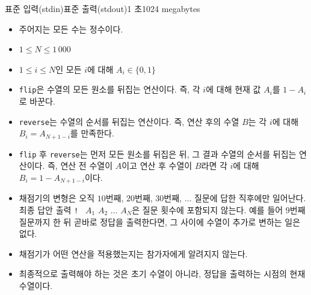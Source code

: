 \begin{problem}{\probtitle}{표준 입력(stdin)}{표준 출력(stdout)}{1 초}{1024 megabytes}
\newpage 

\Constraints

\begin{itemize}[topsep=0pt,noitemsep]
    \item 주어지는 모든 수는 정수이다.
    \item $1 \le N \le 1\,000$
    \item $1 \le i \le N$인 모든 $i$에 대해 $A_i \in \{0,1\}$
\end{itemize}

\Example

\begin{example}
\end{example}

\Notes

\begin{itemize}[topsep=0pt,noitemsep] 
    \item \texttt{flip}은 수열의 모든 원소를 뒤집는 연산이다. 즉, 각 $i$에 대해 현재 값 $A_i$를 $1 - A_i$로 바꾼다.
    \item \texttt{reverse}는 수열의 순서를 뒤집는 연산이다. 즉, 연산 후의 수열 $B$는 각 $i$에 대해 $B_i = A_{N+1-i}$를 만족한다.
    \item \texttt{flip} 후 \texttt{reverse}는 먼저 모든 원소를 뒤집은 뒤, 그 결과 수열의 순서를 뒤집는 연산이다. 즉, 연산 전 수열이 $A$이고 연산 후 수열이 $B$라면 각 $i$에 대해 $B_i = 1 - A_{N+1-i}$이다.
    \item 채점기의 변형은 오직 $10$번째, $20$번째, $30$번째, $\dots$ 질문에 답한 직후에만 일어난다. 최종 답안 출력 \texttt{! } $A_1$ $A_2$ $\dots$ $A_N$은 질문 횟수에 포함되지 않는다. 예를 들어 $9$번째 질문까지 한 뒤 곧바로 정답을 출력한다면, 그 사이에 수열이 추가로 변하는 일은 없다.
    \item 채점기가 어떤 연산을 적용했는지는 참가자에게 알려지지 않는다.
    \item 최종적으로 출력해야 하는 것은 초기 수열이 아니라, 정답을 출력하는 시점의 현재 수열이다.
\end{itemize}

\end{problem}